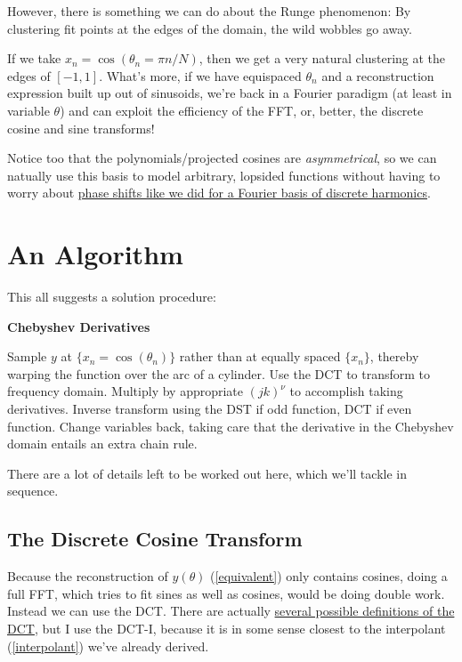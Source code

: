 \documentclass[10pt]{article}
\begin{document}
However, there is something we can do about the Runge phenomenon: By clustering fit points at the edges of the domain, the wild wobbles go away.

If we take $x_n = \cos(\theta_n = \pi n/N)$, then we get a very natural clustering at the edges of $[-1, 1]$. What's more, if we have equispaced $\theta_n$ and a reconstruction expression built up out of sinusoids, we're back in a Fourier paradigm (at least in variable $\theta$) and can exploit the efficiency of the FFT, or, better, the discrete cosine and sine transforms!\cite{dct}\cite{dst}

Notice too that the polynomials/projected cosines are \textit{asymmetrical}, so we can natually use this basis to model arbitrary, lopsided functions without having to worry about \hyperref[phase]{phase shifts like we did for a Fourier basis of discrete harmonics}.

\section{An Algorithm}\label{algo}

This all suggests a solution procedure:

\begin{algorithm}
\caption*{\textbf{Chebyshev Derivatives}}
\begin{algorithmic}[1] %
	\STATE Sample $y$ at $\{x_n = \cos(\theta_n)\}$ rather than at equally spaced $\{x_n\}$, thereby warping the function over the arc of a cylinder.
	\STATE Use the DCT to transform to frequency domain.
	\STATE Multiply by appropriate $(jk)^\nu$ to accomplish taking derivatives.
	\STATE Inverse transform using the DST if odd function, DCT if even function.
	\STATE Change variables back, taking care that the derivative in the Chebyshev domain entails an extra chain rule.
\end{algorithmic}
\end{algorithm}

There are a lot of details left to be worked out here, which we'll tackle in sequence.

\subsection{The Discrete Cosine Transform}\label{fftdct}

Because the reconstruction of $y(\theta)$ (\autoref{equivalent}) only contains cosines, doing a full FFT, which tries to fit sines as well as cosines, would be doing double work. Instead we can use the DCT. There are actually \href{https://docs.scipy.org/doc/scipy/reference/generated/scipy.fft.dct.html}{several possible definitions of the DCT}\cite{dct}, but I use the DCT-I, because it is in some sense closest to the interpolant (\autoref{interpolant}) we've already derived.
\end{document}
